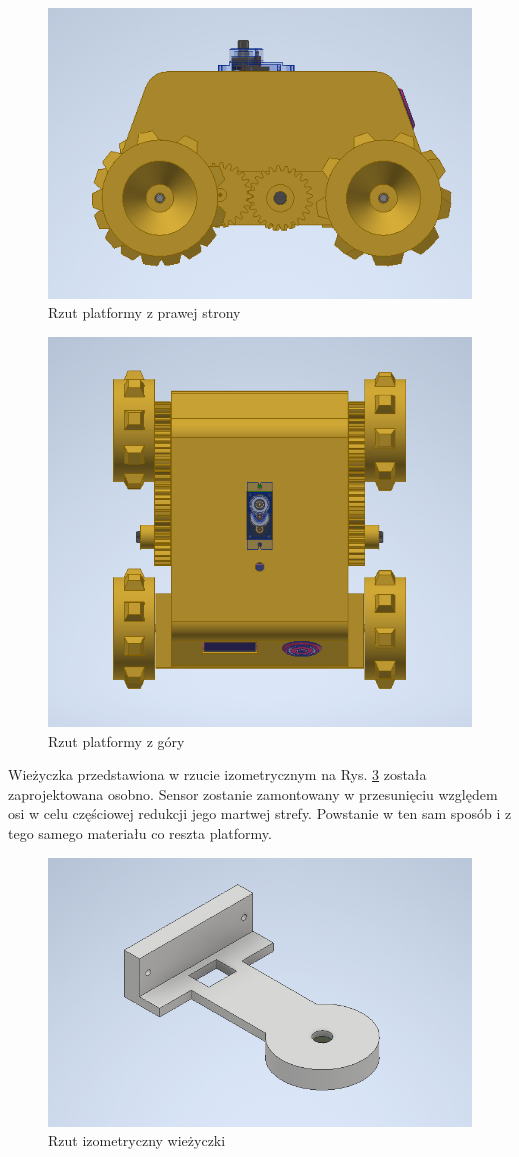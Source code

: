 \begin{figure}[H]
	\centering
		\includegraphics[width=0.5\linewidth]{rys/view2.png}
	\caption{Rzut platformy z prawej strony}
	\label{fig:view2}
\end{figure}

\begin{figure}[H]
	\centering
		\includegraphics[width=0.5\linewidth]{rys/view3.png}
	\caption{Rzut platformy z góry}
	\label{fig:view3}
\end{figure}

Wieżyczka przedstawiona w rzucie izometrycznym na Rys. \ref{fig:tower} została zaprojektowana osobno. Sensor zostanie zamontowany w przesunięciu względem osi w celu częściowej redukcji jego martwej strefy. Powstanie w ten sam sposób i z tego samego materiału co reszta platformy.

\begin{figure}[ht]
	\centering
		\includegraphics[width=0.5\linewidth]{rys/arm.png}
	\caption{Rzut izometryczny wieżyczki}
	\label{fig:tower}
\end{figure}

